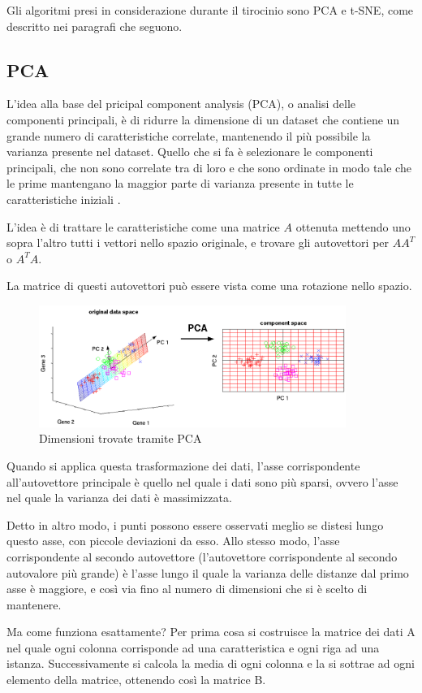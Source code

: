 \documentclass[12pt,italian]{report}
\begin{document}
Gli algoritmi presi in considerazione durante il tirocinio sono PCA e t-SNE, come descritto nei paragrafi che seguono.

\subsection{PCA}
L'idea alla base del pricipal component analysis (PCA), o analisi delle componenti principali, è di ridurre la dimensione di un dataset che contiene un grande numero di caratteristiche correlate, mantenendo il più possibile la varianza presente nel dataset. Quello che si fa è selezionare le componenti principali, che non sono correlate tra di loro e che sono ordinate in modo tale che le prime  mantengano la maggior parte di varianza presente in tutte le caratteristiche iniziali \cite{pca}.

L'idea è di trattare le caratteristiche come una matrice $A$ ottenuta mettendo uno sopra l'altro tutti i vettori nello spazio originale, e trovare gli autovettori per $A A^{T}$ o $A^{T}A$. 

La matrice di questi autovettori può essere vista come una rotazione nello spazio. 
\begin{figure}[h]
\centering
\includegraphics[width = 100mm]{immagini/pca}
\caption{Dimensioni trovate tramite PCA \cite{pcaFigura}}
\end{figure}


Quando si applica questa trasformazione dei dati, l'asse corrispondente all'autovettore principale è quello nel quale i dati sono più sparsi, ovvero l'asse nel quale la varianza dei dati è massimizzata.

Detto in altro modo, i punti possono essere osservati meglio se distesi lungo questo asse, con piccole deviazioni da esso. Allo stesso modo, l'asse corrispondente al secondo autovettore (l'autovettore corrispondente al secondo autovalore più grande) è l'asse lungo il quale la varianza delle distanze dal primo asse è maggiore, e così via fino al numero di dimensioni che si è scelto di mantenere.

Ma come funziona esattamente? 
Per prima cosa si costruisce la matrice dei dati A nel quale ogni colonna corrisponde ad una caratteristica e ogni riga ad una istanza. Successivamente si calcola la media di ogni colonna e la si sottrae ad ogni elemento della matrice, ottenendo così la matrice B.
\end{document}
